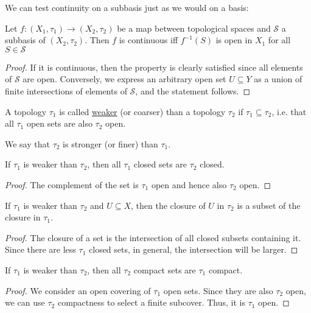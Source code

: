 \documentclass[twoside,symmetric, openany, 12pt]{./tuftebook}
\theoremstyle{definition}
\theoremstyle{definition}
\theoremstyle{definition}
\begin{document}
	We can test continuity on a subbasis just as we would on a basis:
	\begin{Theorem}
		Let $f:(X_1, \tau_1)\to (X_2, \tau_2)$ be a map between topological spaces and $\mathcal{S}$ a subbasis of $(X_2, \tau_2)$. Then $f$ is continuous iff $f^{-1}(S)$ is open in $X_1$ for all $S\in \mathcal{S}$
	\end{Theorem}
	\begin{proof}
		If it is continuous, then the property is clearly satisfied since all elements of $\mathcal{S}$ are open. Conversely, we express an arbitrary open set $U\subseteq Y$ as a union of finite intersections of elements of $\mathcal{S}$, and the statement follows.
	\end{proof}
	\begin{Definition}
		A topology $\tau_1$ is called \uline{weaker} (or coarser) than a topology $\tau_2$ if $\tau_1\subseteq \tau_2$, i.e. that all $\tau_1$ open sets are also $\tau_2$ open.
		
		We say that $\tau_2$ is stronger (or finer) than $\tau_1$.
	\end{Definition}
	\begin{Corollary}
		If $\tau_1$ is weaker than $\tau_2$, then all $\tau_1$ closed sets are $\tau_2$ closed.
	\end{Corollary}
	\begin{proof}
		The complement of the set is $\tau_1$ open and hence also $\tau_2$ open.
	\end{proof}
	\begin{Corollary}
		If $\tau_1$ is weaker than $\tau_2$ and $U\subseteq X$, then the closure of $U$ in $\tau_2$ is a subset of the closure in $\tau_1$.
	\end{Corollary}
	\begin{proof}
		The closure of a set is the intersection of all closed subsets containing it. Since there are less $\tau_1$ closed sets, in general, the intersection will be larger.
	\end{proof}
	\begin{Corollary}
		If $\tau_1$ is weaker than $\tau_2$, then all $\tau_2$ compact sets are $\tau_1$ compact.
	\end{Corollary}
	\begin{proof}
		We consider an open covering of $\tau_1$ open sets. Since they are also $\tau_2$ open, we can use $\tau_2$ compactness to select a finite subcover. Thus, it is $\tau_1$ open.
	\end{proof}
\end{document}
